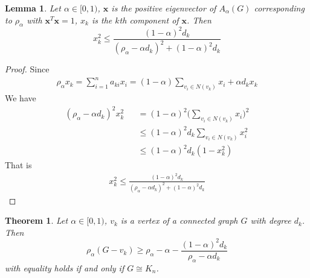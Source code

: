 \documentclass[amsthm]{elsart}
\newtheorem{theorem}{Theorem}[section]
\newtheorem{lemma}{Lemma}[section]
\begin{document}
\begin{lemma} \label{lem:3}
Let $\alpha \in [0, 1)$, $\textbf{x}$ is the positive eigenvector of $A_\alpha (G)$ corresponding to $\rho _\alpha$  with $\textbf{x}^T \textbf{x} = 1$, $x_k$ is the $k$th component of $\textbf{x}$. Then \\
\begin{equation} \label{equ:14}
x_k^2 \leqslant \frac{(1 - \alpha)^2 d_k}{(\rho _\alpha - \alpha d_k)^2 + (1 - \alpha)^2 d_k}
\end{equation}
\end{lemma}

\begin{proof}
Since
\begin{eqnarray*}
\rho _\alpha x_k = \sum \limits_{i = 1}^{n} a_{ki} x_i = (1 - \alpha) \sum \limits_{v_i \in N(v_k)}^{} x_i + \alpha d_k x_k
\end{eqnarray*}
We have
\begin{eqnarray*}
 (\rho _\alpha - \alpha d_k)^2 x_k^2
    &&= (1 - \alpha)^2 \big(\sum \limits_{v_i \in N(v_k)}^{} x_i \big)^2
    \\ &&\leqslant  (1 - \alpha)^2 d_k \sum \limits_{v_i \in N(v_k)}^{} x_i^2
    \\ &&\leqslant  (1 - \alpha)^2 d_k (1 - x_k^2)
\end{eqnarray*}
That is
\begin{eqnarray*}
x_k^2 \leqslant \frac{(1 - \alpha)^2 d_k}{(\rho _\alpha - \alpha d_k)^2 + (1 - \alpha)^2 d_k}
\end{eqnarray*}
\end{proof}

\begin{theorem} \label{the:4}
Let $\alpha \in [0, 1)$, $v_k$ is a vertex of a connected graph $G$ with degree $d_k$.  Then
\begin{equation} \label{equ:16}
\rho _\alpha (G - v_k)
  \geqslant \rho _\alpha - \alpha - \frac{(1 - \alpha)^2 d_k}{\rho _\alpha - \alpha d_k}
\end{equation}
with equality holds if and only if $G \cong K_n$.
\end{theorem}
\end{document}
